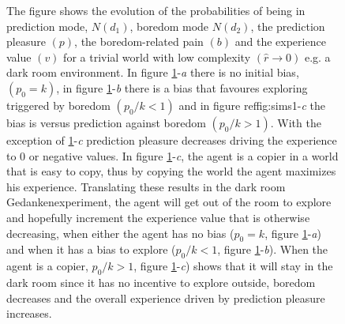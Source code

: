 \documentclass[11pt, onecolumn]{article}
\begin{document}
\begin{figure}[H]
    \hfill
    \hfill
    \caption{The figure shows the evolution of the probabilities of being in prediction mode, $N(d_1)$, boredom mode $N(d_2)$, the prediction pleasure $(p)$, the boredom-related pain $(b)$ and the experience value $(v)$ for a trivial world with low complexity $(\hat{r} \to 0)$ e.g. a dark room environment. In figure \ref{fig:sims1}-\emph{a} there is no initial bias, $(p_0 = k)$, in figure \ref{fig:sims1}-\emph{b} there is a bias that favoures exploring triggered by boredom $(p_0/k < 1)$ and in figure ref{fig:sims1}-\emph{c} the bias is versus prediction against boredom $(p_0/k > 1)$. With the exception of \ref{fig:sims1}-\emph{c} prediction pleasure decreases driving the experience to 0 or negative values. In figure \ref{fig:sims1}-\emph{c}, the agent is a copier in a world that is easy to copy, thus by copying the world the agent maximizes his experience. Translating these results in the dark room Gedankenexperiment, the agent will get out of the room to explore and hopefully increment the experience value that is otherwise decreasing, when either the agent has no bias ($p_0 = k$, figure \ref{fig:sims1}-\emph{a}) and when it has a bias to explore ($p_0/k < 1$, figure \ref{fig:sims1}-\emph{b}). When the agent is a copier, $p_0/k  > 1$, figure \ref{fig:sims1}-\emph{c}) shows that it will stay in the dark room since it has no incentive to explore outside, boredom decreases and the overall experience driven by prediction pleasure increases.}
    \label{fig:sims1}
\end{figure}
\end{document}
